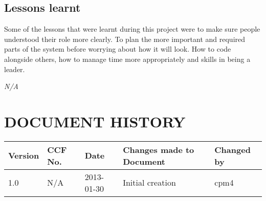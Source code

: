 \documentclass{project}
\begin{document}
\subsection{Lessons learnt}
Some of the lessons that were learnt during this project were to make sure people understood their role more clearly. To plan the more important and required parts of the system before worrying about how it will look. How to code alongside others, how to manage time more appropriately and skills in being a leader.

\clearpage
{}
\begin{thebibliography}{5}
\bibitem{} \emph{N/A}
\end{thebibliography}
\clearpage
{}
\section*{DOCUMENT HISTORY}
\begin{tabular}{|l | l | l | l | l |}
\hline
Version & CCF No. & Date & Changes made to Document & Changed by \\
\hline
1.0 & N/A & 2013-01-30 & Initial creation & cpm4 \\
\hline
\end{tabular}
\label{thelastpage}
\end{document}
